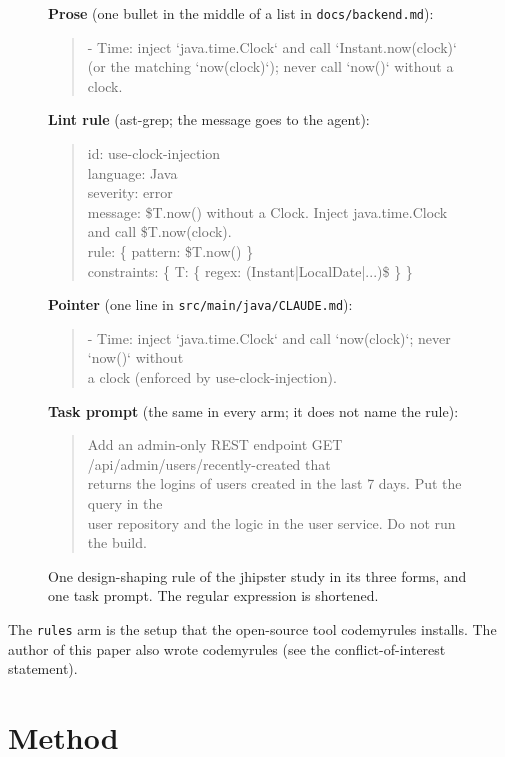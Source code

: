 \documentclass[pdflatex,sn-basic]{sn-jnl}
\newcommand{\file}[1]{\texttt{#1}}
\newcommand{\arm}[1]{\texttt{#1}}
\begin{document}
\begin{figure}[!htb]
\small
\textbf{Prose} (one bullet in the middle of a list in \file{docs/backend.md}):
\begin{quote}\ttfamily\footnotesize
- Time: inject `java.time.Clock` and call `Instant.now(clock)`\\
\hspace*{1em}(or the matching `now(clock)`); never call `now()` without a clock.
\end{quote}
\textbf{Lint rule} (ast-grep; the message goes to the agent):
\begin{quote}\ttfamily\footnotesize
id: use-clock-injection\\
language: Java\\
severity: error\\
message: \$T.now() without a Clock. Inject java.time.Clock and call \$T.now(clock).\\
rule: \{ pattern: \$T.now() \}\\
constraints: \{ T: \{ regex: (Instant|LocalDate|...)\$ \} \}
\end{quote}
\textbf{Pointer} (one line in \file{src/main/java/CLAUDE.md}):
\begin{quote}\ttfamily\footnotesize
- Time: inject `java.time.Clock` and call `now(clock)`; never `now()` without\\
\hspace*{1em}a clock (enforced by use-clock-injection).
\end{quote}
\textbf{Task prompt} (the same in every arm; it does not name the rule):
\begin{quote}\ttfamily\footnotesize
Add an admin-only REST endpoint GET /api/admin/users/recently-created that\\
returns the logins of users created in the last 7 days. Put the query in the\\
user repository and the logic in the user service. Do not run the build.
\end{quote}
\caption{One design-shaping rule of the jhipster study in its three forms, and one task prompt. The regular expression is shortened.}
\label{fig:example}
\end{figure}

The \arm{rules} arm is the setup that the open-source tool codemyrules installs.
The author of this paper also wrote codemyrules (see the conflict-of-interest statement).

\section{Method}
\label{sec:method}
\end{document}
